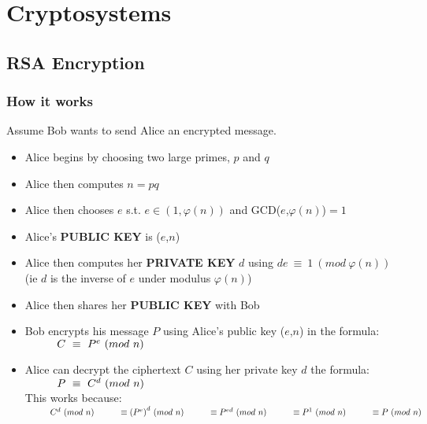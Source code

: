 \documentclass{article}
\newcommand\tabOne[1][1cm]{\hspace*{#1}}
\begin{document}
\newpage		
\section{Cryptosystems}

\subsection{RSA Encryption}
	\subsubsection{How it works}
	Assume Bob wants to send Alice an encrypted message.
	\begin{itemize}
		\item Alice begins by choosing two large primes, $p$ and $q$
		\item Alice then computes $n=pq$
		\item Alice then chooses $e$ s.t. $e\in(1,\varphi(n))$ and GCD($e$,$\varphi(n)$)$=1$
		\item Alice's \textbf{PUBLIC KEY} is ($e$,$n$)
		\item Alice then computes her \textbf{PRIVATE KEY} $d$ using $de~\equiv~1~(mod~\varphi(n))$ (ie $d$ is the inverse of $e$ under modulus $\varphi(n)$)
		\item Alice then shares her \textbf{PUBLIC KEY} with Bob
		\item Bob encrypts his message $P$ using Alice's public key ($e$,$n$) in the formula:\\
			$
				\tabOne	C~\equiv~P^e~(mod~n)
			$
		\item Alice can decrypt the ciphertext $C$ using her private key $d$ the formula:\\
			$
				\tabOne P~\equiv~C^d~(mod~n)\\
			$\\
			This works because:\\
			$
				\tabOne	C^d~(mod~n)\\
				\tabOne	\equiv {(P^e)}^d~(mod~n)\\
				\tabOne	\equiv P^{ed}~(mod~n)\\
				\tabOne	\equiv P^1~(mod~n)\\
				\tabOne	\equiv P~(mod~n)\\
			$
	\end{itemize}
	
\end{document}
